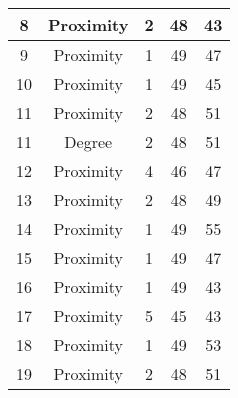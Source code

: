 \documentclass[results.tex]{subfiles}
\begin{document}
\begin{center}
\begin{tabular}{| c || c | c | c | c |}
            \hline
            8                       & Proximity                    & 2                      & 48                      & 43                   \\
            \hline
            9                       & Proximity                    & 1                      & 49                      & 47                   \\
            \hline
            10                      & Proximity                    & 1                      & 49                      & 45                   \\
            \hline
            11                      & Proximity                    & 2                      & 48                      & 51                   \\
            \hline
            11                      & Degree                       & 2                      & 48                      & 51                   \\
            \hline
            12                      & Proximity                    & 4                      & 46                      & 47                   \\
            \hline
            13                      & Proximity                    & 2                      & 48                      & 49                   \\
            \hline
            14                      & Proximity                    & 1                      & 49                      & 55                   \\
            \hline
            15                      & Proximity                    & 1                      & 49                      & 47                   \\
            \hline
            16                      & Proximity                    & 1                      & 49                      & 43                   \\
            \hline
            17                      & Proximity                    & 5                      & 45                      & 43                   \\
            \hline
            18                      & Proximity                    & 1                      & 49                      & 53                   \\
            \hline
            19                      & Proximity                    & 2                      & 48                      & 51                   \\

\end{tabular}
\end{center}
\end{document}
